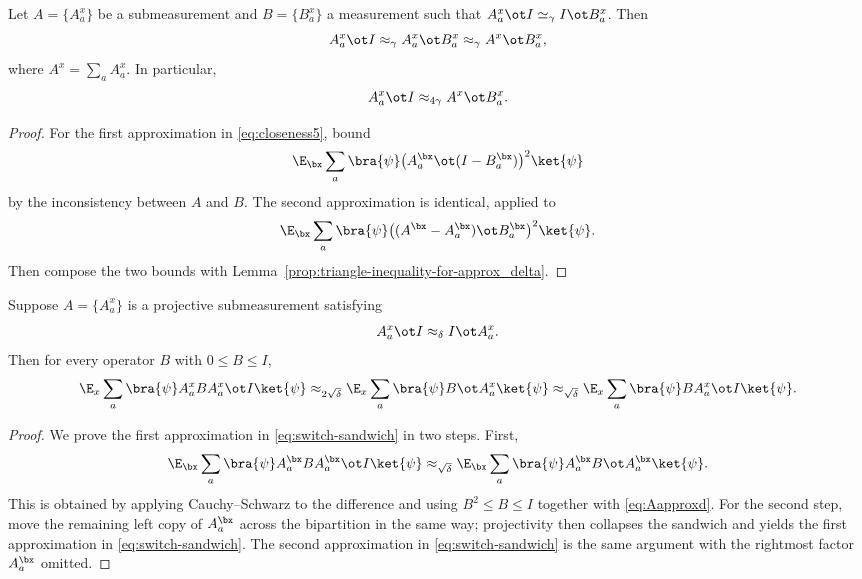 \begin{lemma}\label{prop:cons-sub-meas}
	\leanok
	Let $A=\{A_a^x\}$ be a submeasurement and $B=\{B_a^x\}$ a measurement such that $A_a^x \ot I \simeq_\gamma I \ot B_a^x$. Then
	\begin{equation}
		A_a^x \ot I \approx_\gamma A_a^x \ot B_a^x \approx_\gamma A^x \ot B_a^x,
		\label{eq:closeness5}
	\end{equation}
	where $A^x=\sum_a A_a^x$. In particular,
	\[
		A_a^x \ot I \approx_{4\gamma} A^x \ot B_a^x.
	\]
\end{lemma}
\begin{proof}
	\leanok
	For the first approximation in \eqref{eq:closeness5}, bound
	\[
		\E_{\bx} \sum_a \bra{\psi} \bigl(A^{\bx}_a \ot (I-B^{\bx}_a)\bigr)^2 \ket{\psi}
	\]
	by the inconsistency between $A$ and $B$. The second approximation is identical, applied to
	\[
		\E_{\bx} \sum_a \bra{\psi} \bigl((A^\bx-A^\bx_a)\ot B^\bx_a\bigr)^2 \ket{\psi}.
	\]
	Then compose the two bounds with Lemma~\ref{prop:triangle-inequality-for-approx_delta}.
\end{proof}

\begin{lemma}\label{prop:switch-sandwich}
	\leanok
	Suppose $A=\{A_a^x\}$ is a projective submeasurement satisfying
	\begin{equation}
		A_a^x \ot I \approx_\delta I \ot A_a^x.
		\label{eq:Aapproxd}
	\end{equation}
	Then for every operator $B$ with $0 \le B \le I$,
	\begin{equation}
		\E_x \sum_a \bra{\psi} A_a^x B A_a^x \ot I \ket{\psi}
		\approx_{2\sqrt\delta}
		\E_x \sum_a \bra{\psi} B \ot A_a^x \ket{\psi}
		\approx_{\sqrt\delta}
		\E_x \sum_a \bra{\psi} BA_a^x \ot I \ket{\psi}.
		\label{eq:switch-sandwich}
	\end{equation}
\end{lemma}
\begin{proof}
	\leanok
	We prove the first approximation in \eqref{eq:switch-sandwich} in two steps. First,
	\begin{equation}
		\E_{\bx} \sum_a \bra{\psi} A^{\bx}_a B A^{\bx}_a \ot I \ket{\psi}
		\approx_{\sqrt{\delta}}
		\E_{\bx} \sum_a \bra{\psi} A^{\bx}_a B \ot A^{\bx}_a \ket{\psi}.
		\label{eq:shift-right-A}
	\end{equation}
	This is obtained by applying Cauchy--Schwarz to the difference and using $B^2 \le B \le I$ together with \eqref{eq:Aapproxd}. For the second step, move the remaining left copy of $A^\bx_a$ across the bipartition in the same way; projectivity then collapses the sandwich and yields the first approximation in \eqref{eq:switch-sandwich}. The second approximation in \eqref{eq:switch-sandwich} is the same argument with the rightmost factor $A_a^\bx$ omitted.
\end{proof}

